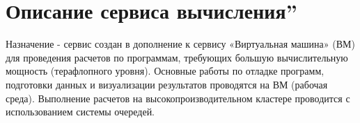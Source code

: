 \documentclass[a4paper,8pt]{extreport}
\newcounter{ex}
\begin{document}
\tableofcontents
\thispagestyle{empty}

\lstset{language=, linewidth=1.0\textwidth, breaklines=true,
breakatwhitespace=true, frame=single, framexleftmargin=0em,
resetmargins=true,
columns=flexible,
flexiblecolumns,
inputencoding=utf8,
extendedchars=\true,
escapechar=\%,
texcl,
}
\frenchspacing

\pagestyle{fancy}

\chapter{Описание сервиса  вычисления\textquotedblright}

Назначение - сервис создан в дополнение к сервису «Виртуальная машина» (ВМ) для проведения расчетов по программам,
требующих большую вычислительную мощность (терафлопного уровня). Основные работы по отладке программ, 
подготовки данных и визуализации результатов проводятся на ВМ (рабочая среда). Выполнение расчетов на 
высокопроизводительном кластере проводится с использованием системы очередей. 
\end{document}
